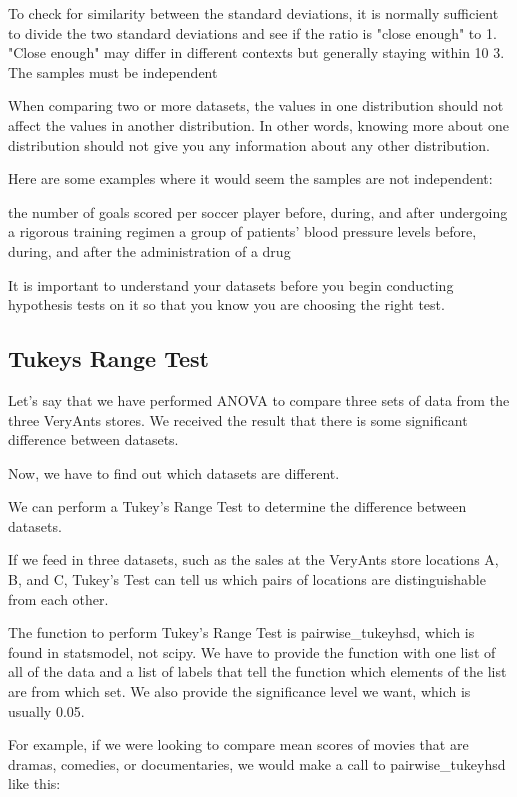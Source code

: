 \documentclass{journal}
\begin{document}
To check for similarity between the standard deviations, it is normally sufficient to divide the two standard deviations and see if the ratio is "close enough" to 1. "Close enough" may differ in different contexts but generally staying within 10%
3. The samples must be independent

When comparing two or more datasets, the values in one distribution should not affect the values in another distribution. In other words, knowing more about one distribution should not give you any information about any other distribution.

Here are some examples where it would seem the samples are not independent:

    the number of goals scored per soccer player before, during, and after undergoing a rigorous training regimen
    a group of patients' blood pressure levels before, during, and after the administration of a drug

It is important to understand your datasets before you begin conducting hypothesis tests on it so that you know you are choosing the right test.

\subsection{Tukeys Range Test}
Let's say that we have performed ANOVA to compare three sets of data from the three VeryAnts stores. We received the result that there is some significant difference between datasets.

Now, we have to find out which datasets are different.

We can perform a Tukey's Range Test to determine the difference between datasets.

If we feed in three datasets, such as the sales at the VeryAnts store locations A, B, and C, Tukey's Test can tell us which pairs of locations are distinguishable from each other.

The function to perform Tukey's Range Test is pairwise_tukeyhsd, which is found in statsmodel, not scipy. We have to provide the function with one list of all of the data and a list of labels that tell the function which elements of the list are from which set. We also provide the significance level we want, which is usually 0.05.

For example, if we were looking to compare mean scores of movies that are dramas, comedies, or documentaries, we would make a call to pairwise_tukeyhsd like this:
\end{document}
